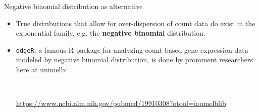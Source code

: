 \documentclass{beamer}
\newenvironment{wideitemize}%
  {\begin{itemize}%
    \setlength{\parskip}{1em}}%
  {\end{itemize}}
\begin{document}
\begin{frame}{Negative binomial distribution as alternative}

\begin{wideitemize}
\item True distributions that allow for over-dispersion of count data do exist in the exponential family, e.g. the {\bf negative binomial} distribution. 

\item
\texttt{edgeR},  a famous R package for analyzing count-based gene expression data modeled by  negative binomial distribution, is done by prominent researchers here at unimelb:

\ \

 \url{https://www.ncbi.nlm.nih.gov/pubmed/19910308?otool=iaumelblib} 


\ \


\end{wideitemize}


\end{frame}
\end{document}
